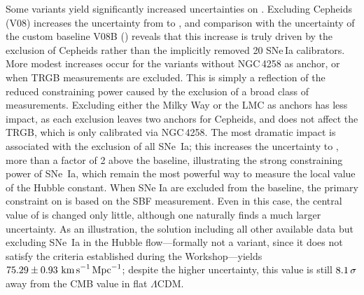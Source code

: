 Some variants yield significantly increased uncertainties on \Hcst{}. Excluding Cepheids (V08) increases the uncertainty from {\Herrorbase} to {\Herrornoceph} {\Hunit}, and comparison with the uncertainty of the custom baseline V08B (\Herrorcustbasenoceph) reveals that this increase is truly driven by the exclusion of Cepheids rather than the implicitly removed 20 SNe\,Ia calibrators. 
More modest increases occur for the variants without NGC$\,$4258 as anchor, or when TRGB measurements are excluded. This is simply a reflection of the reduced constraining power caused by the exclusion of a broad class of measurements. Excluding either the Milky Way or the LMC as anchors has less impact, as each exclusion leaves two anchors for Cepheids, and does not affect the TRGB, which is only calibrated via NGC$\,$4258. The most dramatic impact is associated with the exclusion of all SNe~Ia; this increases the uncertainty to {\Herrornosnia} {\Hunit}, more than a factor of 2 above the baseline, illustrating the strong constraining power of SNe~Ia, which remain the most powerful way to measure the local value of the Hubble constant. 
When SNe Ia are excluded from the baseline, the primary constraint on {\Hcst} is based on the SBF measurement. Even in this case, the central value of {\Hcst} is changed only little, although one naturally finds a much larger uncertainty. As an illustration, the solution including all other available data but excluding SNe~Ia in the Hubble flow---formally not a variant, since it does not satisfy the criteria established during the Workshop---yields $ 75.29 \pm 0.93 \, \,{\rm km\,s}^{-1}{\rm\,Mpc}^{-1} $; despite the higher uncertainty, this value is still $8.1 \, \sigma $ away from the CMB value in flat $\Lambda$CDM.

